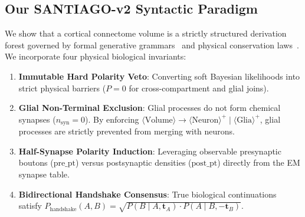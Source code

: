\documentclass[10pt,twocolumn,letterpaper]{article}
\begin{document}
\subsection{Our SANTIAGO-v2 Syntactic Paradigm}
We show that a cortical connectome volume is a strictly structured derivation forest governed by formal generative grammars~\cite{grayroncal2016} and physical conservation laws~\cite{cajal1909}. We incorporate four physical biological invariants:
\begin{enumerate}
    \item \textbf{Immutable Hard Polarity Veto}: Converting soft Bayesian likelihoods into strict physical barriers ($P = 0$ for cross-compartment and glial joins).
    \item \textbf{Glial Non-Terminal Exclusion}: Glial processes do not form chemical synapses ($n_{\text{syn}} = 0$). By enforcing $\langle \text{Volume} \rangle \to \langle \text{Neuron} \rangle^+ \mid \langle \text{Glia} \rangle^+$, glial processes are strictly prevented from merging with neurons.
    \item \textbf{Half-Synapse Polarity Induction}: Leveraging observable presynaptic boutons ($\text{pre\_pt}$) versus postsynaptic densities ($\text{post\_pt}$) directly from the EM synapse table.
    \item \textbf{Bidirectional Handshake Consensus}: True biological continuations satisfy $P_{\text{handshake}}(A, B) = \sqrt{P(B \mid A, \mathbf{t}_A) \cdot P(A \mid B, -\mathbf{t}_B)}$.
\end{enumerate}
\end{document}
